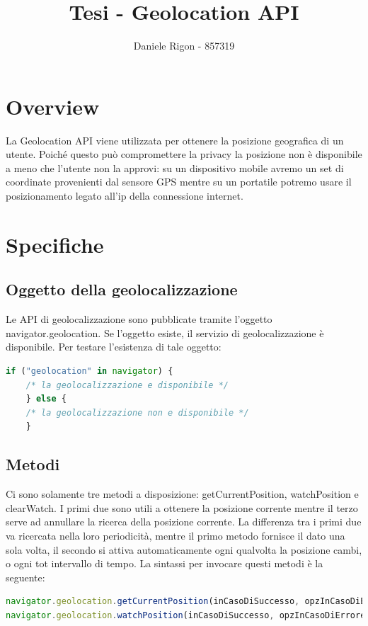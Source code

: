 \documentclass[11pt ,a4paper , twoside , openright ]{article}
\author{
	Daniele Rigon - 857319 \\
}
\begin{document}
	
\title{Tesi - Geolocation API}
\maketitle

\tableofcontents
\pagebreak

\section{Overview}
La Geolocation API viene utilizzata per ottenere la posizione geografica di un utente. 
Poiché questo può compromettere la privacy la posizione non è disponibile a meno che l'utente non la approvi: su un dispositivo mobile avremo un set di coordinate provenienti dal sensore GPS mentre su un portatile potremo usare il posizionamento legato all’ip della connessione internet.

\section{Specifiche}

\subsection{Oggetto della geolocalizzazione}
Le API di geolocalizzazione sono pubblicate tramite l'oggetto navigator.geolocation. Se l'oggetto esiste, il servizio di geolocalizzazione è disponibile. Per testare l'esistenza di tale oggetto:
%
\begin{lstlisting}[language=JavaScript]
	if ("geolocation" in navigator) {
	/* la geolocalizzazione e disponibile */
	} else {
	/* la geolocalizzazione non e disponibile */
	}
\end{lstlisting}

\subsection{Metodi}
Ci sono solamente tre metodi a disposizione: getCurrentPosition, watchPosition e clearWatch. I primi due sono utili a ottenere la posizione corrente mentre il terzo serve ad annullare la ricerca della posizione corrente. 
La differenza tra i primi due va ricercata nella loro periodicità, mentre il primo metodo fornisce il dato una sola volta, il secondo si attiva automaticamente ogni qualvolta la posizione cambi, o ogni tot intervallo di tempo.
La sintassi per invocare questi metodi è la seguente:
\begin{lstlisting}[language=JavaScript]
navigator.geolocation.getCurrentPosition(inCasoDiSuccesso, opzInCasoDiErrore, opzioni); 
navigator.geolocation.watchPosition(inCasoDiSuccesso, opzInCasoDiErrore, opzioni);
\end{lstlisting}
\end{document}
